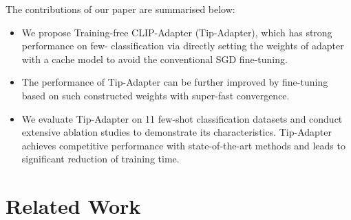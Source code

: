 \documentclass[10pt,twocolumn,letterpaper]{article}
\begin{document}
The contributions of our paper are summarised below:
\begin{itemize}
    \item We propose Training-free CLIP-Adapter (Tip-Adapter), which has strong performance on few- classification via directly setting the weights of adapter with a cache model to avoid the conventional SGD fine-tuning. 
    
    \item The performance of Tip-Adapter can be further improved by fine-tuning based on such constructed weights with super-fast convergence.
    
    \item We evaluate Tip-Adapter on 11 few-shot classification datasets and conduct extensive ablation studies to demonstrate its characteristics. Tip-Adapter achieves competitive performance with state-of-the-art methods and leads to significant reduction of training time. 
\end{itemize}

\section{Related Work}
\label{sec:related work}
\end{document}
